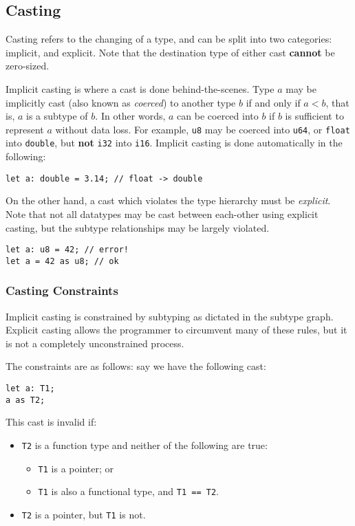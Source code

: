 \subsection{Casting}\label{subsec:type-casting}

Casting refers to the changing of a type, and can be split into two categories: implicit, and explicit.
Note that the destination type of either cast \textbf{cannot} be zero-sized.

Implicit casting is where a cast is done behind-the-scenes.
Type \(a\) may be implicitly cast (also known as \textit{coerced}) to another type \(b\) if and only if \(a < b\), that is, \(a\) is a subtype of \(b\).
In other words, \(a\) can be coerced into \(b\) if \(b\) is sufficient to represent \(a\) without data loss.
For example, \texttt{u8} may be coerced into \texttt{u64}, or \texttt{float} into \texttt{double}, but \textbf{not} \texttt{i32} into \texttt{i16}.
Implicit casting is done automatically in the following:

\begin{lstlisting}[language=CustomLang]
let a: double = 3.14; // float -> double
\end{lstlisting}

On the other hand, a cast which violates the type hierarchy must be \textit{explicit}.
Note that not all datatypes may be cast between each-other using explicit casting, but the subtype relationships may be largely violated.

\begin{lstlisting}[language=CustomLang]
let a: u8 = 42; // error!
let a = 42 as u8; // ok
\end{lstlisting}

\subsubsection{Casting Constraints}

Implicit casting is constrained by subtyping as dictated in the subtype graph.
Explicit casting allows the programmer to circumvent many of these rules, but it is not a completely unconstrained process.

The constraints are as follows: say we have the following cast:
\begin{lstlisting}[language=CustomLang]
let a: T1;
a as T2;
\end{lstlisting}

This cast is invalid if:
\begin{itemize}
    \item \texttt{T2} is a function type and neither of the following are true:
    \begin{itemize}
        \item \texttt{T1} is a pointer; or
        \item \texttt{T1} is also a functional type, and \texttt{T1 == T2}.
    \end{itemize}
    \item \texttt{T2} is a pointer, but \texttt{T1} is not.
\end{itemize}

